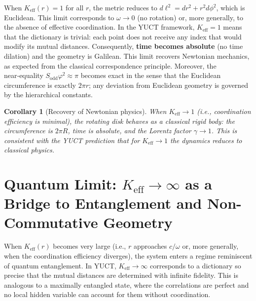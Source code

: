 \documentclass[12pt,a4paper]{article}
\newtheorem{corollary}{Corollary}[section]
\newcommand{\Sodd}{S_{\mathrm{odd}}}
\begin{document}
	When \(K_{\mathrm{eff}}(r) = 1\) for all \(r\), the metric reduces to \(d\ell^2 = dr^2 + r^2 d\phi^2\), which is Euclidean. This limit corresponds to \(\omega \to 0\) (no rotation) or, more generally, to the absence of effective coordination. In the YUCT framework, \(K_{\mathrm{eff}} = 1\) means that the dictionary is trivial: each point does not receive any index that would modify its mutual distances. Consequently, \textbf{time becomes absolute} (no time dilation) and the geometry is Galilean. This limit recovers Newtonian mechanics, as expected from the classical correspondence principle. Moreover, the near‑equality \(\Sodd \varphi^2 \approx \pi\) becomes exact in the sense that the Euclidean circumference is exactly \(2\pi r\); any deviation from Euclidean geometry is governed by the hierarchical constants.
	
	\begin{corollary}[Recovery of Newtonian physics]
		When \(K_{\mathrm{eff}} \to 1\) (i.e., coordination efficiency is minimal), the rotating disk behaves as a classical rigid body: the circumference is \(2\pi R\), time is absolute, and the Lorentz factor \(\gamma \to 1\). This is consistent with the YUCT prediction that for \(K_{\mathrm{eff}} \to 1\) the dynamics reduces to classical physics.
	\end{corollary}
	
	\section{Quantum Limit: \(K_{\mathrm{eff}} \to \infty\) as a Bridge to Entanglement and Non-Commutative Geometry}
	\label{sec:quantum-limit}
	
	When \(K_{\mathrm{eff}}(r)\) becomes very large (i.e., \(r\) approaches \(c/\omega\) or, more generally, when the coordination efficiency diverges), the system enters a regime reminiscent of quantum entanglement. In YUCT, \(K_{\mathrm{eff}} \to \infty\) corresponds to a dictionary so precise that the mutual distances are determined with infinite fidelity. This is analogous to a maximally entangled state, where the correlations are perfect and no local hidden variable can account for them without coordination.
	
\end{document}
